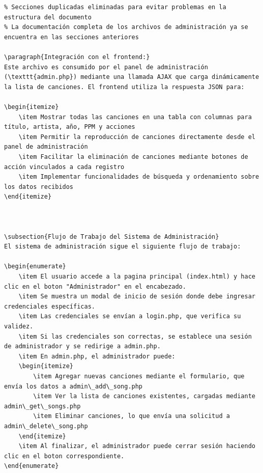 \documentclass[a4paper,12pt]{article}
\begin{document}
\begin{itemize}
\begin{verbatim}
% Secciones duplicadas eliminadas para evitar problemas en la estructura del documento
% La documentación completa de los archivos de administración ya se encuentra en las secciones anteriores

\paragraph{Integración con el frontend:}
Este archivo es consumido por el panel de administración (\texttt{admin.php}) mediante una llamada AJAX que carga dinámicamente la lista de canciones. El frontend utiliza la respuesta JSON para:

\begin{itemize}
    \item Mostrar todas las canciones en una tabla con columnas para título, artista, año, PPM y acciones
    \item Permitir la reproducción de canciones directamente desde el panel de administración
    \item Facilitar la eliminación de canciones mediante botones de acción vinculados a cada registro
    \item Implementar funcionalidades de búsqueda y ordenamiento sobre los datos recibidos
\end{itemize}
    


\subsection{Flujo de Trabajo del Sistema de Administración}
El sistema de administración sigue el siguiente flujo de trabajo:

\begin{enumerate}
    \item El usuario accede a la pagina principal (index.html) y hace clic en el boton "Administrador" en el encabezado.
    \item Se muestra un modal de inicio de sesión donde debe ingresar credenciales específicas.
    \item Las credenciales se envían a login.php, que verifica su validez.
    \item Si las credenciales son correctas, se establece una sesión de administrador y se redirige a admin.php.
    \item En admin.php, el administrador puede:
    \begin{itemize}
        \item Agregar nuevas canciones mediante el formulario, que envía los datos a admin\_add\_song.php
        \item Ver la lista de canciones existentes, cargadas mediante admin\_get\_songs.php
        \item Eliminar canciones, lo que envía una solicitud a admin\_delete\_song.php
    \end{itemize}
    \item Al finalizar, el administrador puede cerrar sesión haciendo clic en el boton correspondiente.
\end{enumerate}


\end{verbatim}
\end{itemize}
\end{document}
